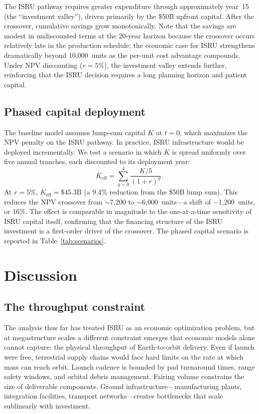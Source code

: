 \documentclass[preprint,12pt]{elsarticle}
\begin{document}
The ISRU pathway requires greater expenditure through approximately year~15 (the ``investment valley''), driven primarily by the \$50B upfront capital. After the crossover, cumulative savings grow monotonically. Note that the savings are modest in undiscounted terms at the 20-year horizon because the crossover occurs relatively late in the production schedule; the economic case for ISRU strengthens dramatically beyond 10{,}000~units as the per-unit cost advantage compounds. Under NPV discounting ($r = 5\%$), the investment valley extends further, reinforcing that the ISRU decision requires a long planning horizon and patient capital.

\subsection{Phased capital deployment}
\label{sec:phased_capital}

The baseline model assumes lump-sum capital $K$ at $t = 0$, which maximizes the NPV penalty on the ISRU pathway. In practice, ISRU infrastructure would be deployed incrementally. We test a scenario in which $K$ is spread uniformly over five annual tranches, each discounted to its deployment year:
\begin{equation}
  K_{\mathrm{eff}} = \sum_{y=0}^{4} \frac{K/5}{(1+r)^y}.
  \label{eq:phased_capital}
\end{equation}
At $r = 5\%$, $K_{\mathrm{eff}} = \$45.3$B (a 9.4\% reduction from the \$50B lump sum). This reduces the NPV crossover from $\sim$7{,}200 to $\sim$6{,}000~units---a shift of $-$1{,}200~units, or 16\%. The effect is comparable in magnitude to the one-at-a-time sensitivity of ISRU capital itself, confirming that the financing structure of the ISRU investment is a first-order driver of the crossover. The phased capital scenario is reported in Table~\ref{tab:scenarios}.

\section{Discussion}
\label{sec:discussion}

\subsection{The throughput constraint}

The analysis thus far has treated ISRU as an economic optimization problem, but at megastructure scales a different constraint emerges that economic models alone cannot capture: the physical throughput of Earth-to-orbit delivery. Even if launch were free, terrestrial supply chains would face hard limits on the rate at which mass can reach orbit. Launch cadence is bounded by pad turnaround times, range safety windows, and orbital debris management. Fairing volume constrains the size of deliverable components. Ground infrastructure---manufacturing plants, integration facilities, transport networks---creates bottlenecks that scale sublinearly with investment.
\end{document}
